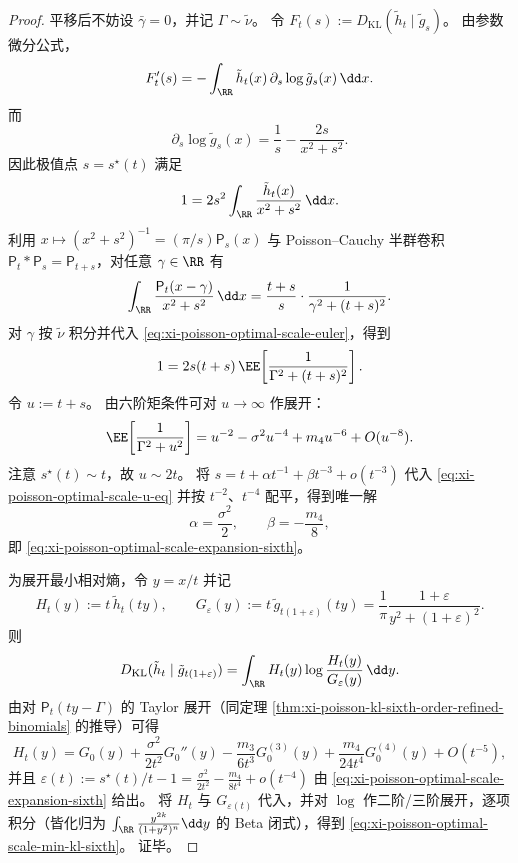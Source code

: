 \begin{proof}
平移后不妨设 \(\bar\gamma=0\)，并记 \(\Gamma\sim\tilde\nu\)。
令 \(F_t(s):=D_{\mathrm{KL}}(\tilde h_t\mid \tilde g_s)\)。
由参数微分公式，
\[
F_t'(s)=-\int_{\RR}\tilde h_t(x)\,\partial_s\log \tilde g_s(x)\,\dd x.
\]
而
\[
\partial_s\log \tilde g_s(x)=\frac1s-\frac{2s}{x^2+s^2}.
\]
因此极值点 \(s=s^\star(t)\) 满足
\begin{equation}\label{eq:xi-poisson-optimal-scale-euler}
1=2s^2\int_{\RR}\frac{\tilde h_t(x)}{x^2+s^2}\,\dd x.
\end{equation}
利用 \(x\mapsto (x^2+s^2)^{-1}=(\pi/s)\mathsf P_s(x)\) 与 Poisson--Cauchy 半群卷积
\(\mathsf P_t*\mathsf P_s=\mathsf P_{t+s}\)，对任意 \(\gamma\in\RR\) 有
\[
\int_{\RR}\frac{\mathsf P_t(x-\gamma)}{x^2+s^2}\,\dd x
=\frac{t+s}{s}\cdot\frac{1}{\gamma^2+(t+s)^2}.
\]
对 \(\gamma\) 按 \(\tilde\nu\) 积分并代入 \eqref{eq:xi-poisson-optimal-scale-euler}，得到
\begin{equation}\label{eq:xi-poisson-optimal-scale-u-eq}
1=2s(t+s)\,\EE\!\left[\frac{1}{\Gamma^2+(t+s)^2}\right].
\end{equation}
令 \(u:=t+s\)。
由六阶矩条件可对 \(u\to\infty\) 作展开：
\[
\EE\!\left[\frac{1}{\Gamma^2+u^2}\right]
=u^{-2}-\sigma^2u^{-4}+m_4u^{-6}+O(u^{-8}).
\]
注意 \(s^\star(t)\sim t\)，故 \(u\sim 2t\)。
将 \(s=t+\alpha t^{-1}+\beta t^{-3}+o(t^{-3})\) 代入 \eqref{eq:xi-poisson-optimal-scale-u-eq} 并按 \(t^{-2}\)、\(t^{-4}\) 配平，得到唯一解
\[
\alpha=\frac{\sigma^2}{2},\qquad \beta=-\frac{m_4}{8},
\]
即 \eqref{eq:xi-poisson-optimal-scale-expansion-sixth}。
\par
为展开最小相对熵，令 \(y=x/t\) 并记
\[
H_t(y):=t\,\tilde h_t(ty),\qquad
G_\varepsilon(y):=t\,\tilde g_{t(1+\varepsilon)}(ty)=\frac{1}{\pi}\frac{1+\varepsilon}{y^2+(1+\varepsilon)^2}.
\]
则
\[
D_{\mathrm{KL}}(\tilde h_t\mid \tilde g_{t(1+\varepsilon)})
=\int_{\RR}H_t(y)\log\frac{H_t(y)}{G_\varepsilon(y)}\,\dd y.
\]
由对 \(\mathsf P_t(ty-\Gamma)\) 的 Taylor 展开（同定理 \ref{thm:xi-poisson-kl-sixth-order-refined-binomials} 的推导）可得
\[
H_t(y)=G_0(y)+\frac{\sigma^2}{2t^2}G_0''(y)-\frac{m_3}{6t^3}G_0^{(3)}(y)+\frac{m_4}{24t^4}G_0^{(4)}(y)+O(t^{-5}),
\]
并且
\(
\varepsilon(t):=s^\star(t)/t-1=\frac{\sigma^2}{2t^2}-\frac{m_4}{8t^4}+o(t^{-4})
\)
由 \eqref{eq:xi-poisson-optimal-scale-expansion-sixth} 给出。
将 \(H_t\) 与 \(G_{\varepsilon(t)}\) 代入，并对 \(\log\) 作二阶/三阶展开，逐项积分（皆化归为
\(\int_{\RR}\frac{y^{2k}}{(1+y^2)^n}\dd y\) 的 Beta 闭式），得到
\eqref{eq:xi-poisson-optimal-scale-min-kl-sixth}。
证毕。
\end{proof}

